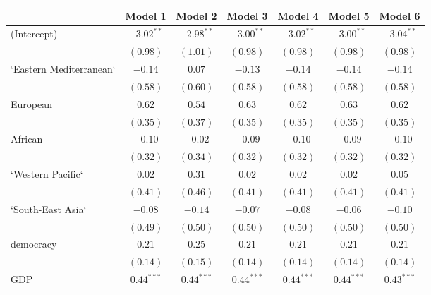 
\begin{table}[!h]
\begin{center}
\begin{tabular}{l c c c c c c }
\toprule
 & Model 1 & Model 2 & Model 3 & Model 4 & Model 5 & Model 6 \\
\midrule
(Intercept)             & $-3.02^{**}$ & $-2.98^{**}$ & $-3.00^{**}$ & $-3.02^{**}$ & $-3.00^{**}$ & $-3.04^{**}$ \\
                        & $(0.98)$     & $(1.01)$     & $(0.98)$     & $(0.98)$     & $(0.98)$     & $(0.98)$     \\
`Eastern Mediterranean` & $-0.14$      & $0.07$       & $-0.13$      & $-0.14$      & $-0.14$      & $-0.14$      \\
                        & $(0.58)$     & $(0.60)$     & $(0.58)$     & $(0.58)$     & $(0.58)$     & $(0.58)$     \\
European                & $0.62$       & $0.54$       & $0.63$       & $0.62$       & $0.63$       & $0.62$       \\
                        & $(0.35)$     & $(0.37)$     & $(0.35)$     & $(0.35)$     & $(0.35)$     & $(0.35)$     \\
African                 & $-0.10$      & $-0.02$      & $-0.09$      & $-0.10$      & $-0.09$      & $-0.10$      \\
                        & $(0.32)$     & $(0.34)$     & $(0.32)$     & $(0.32)$     & $(0.32)$     & $(0.32)$     \\
`Western Pacific`       & $0.02$       & $0.31$       & $0.02$       & $0.02$       & $0.02$       & $0.05$       \\
                        & $(0.41)$     & $(0.46)$     & $(0.41)$     & $(0.41)$     & $(0.41)$     & $(0.41)$     \\
`South-East Asia`       & $-0.08$      & $-0.14$      & $-0.07$      & $-0.08$      & $-0.06$      & $-0.10$      \\
                        & $(0.49)$     & $(0.50)$     & $(0.50)$     & $(0.50)$     & $(0.50)$     & $(0.50)$     \\
democracy               & $0.21$       & $0.25$       & $0.21$       & $0.21$       & $0.21$       & $0.21$       \\
                        & $(0.14)$     & $(0.15)$     & $(0.14)$     & $(0.14)$     & $(0.14)$     & $(0.14)$     \\
GDP                     & $0.44^{***}$ & $0.44^{***}$ & $0.44^{***}$ & $0.44^{***}$ & $0.44^{***}$ & $0.43^{***}$ \\

\end{tabular}
\end{center}
\end{table}
